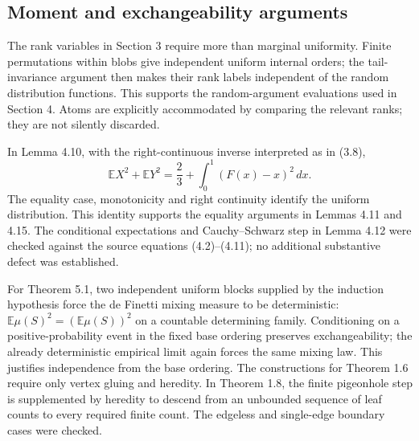 \documentclass[10pt]{article}
\begin{document}
\subsection*{Moment and exchangeability arguments}
The rank variables in Section 3 require more than marginal uniformity. Finite permutations within blobs give independent uniform internal orders; the tail-invariance argument then makes their rank labels independent of the random distribution functions. This supports the random-argument evaluations used in Section 4. Atoms are explicitly accommodated by comparing the relevant ranks; they are not silently discarded.\par
In Lemma 4.10, with the right-continuous inverse interpreted as in (3.8), \[\mathbb E X^2+\mathbb E Y^2
 =\frac23+\int_0^1(F(x)-x)^2\,dx.\] The equality case, monotonicity and right continuity identify the uniform distribution. This identity supports the equality arguments in Lemmas 4.11 and 4.15. The conditional expectations and Cauchy–Schwarz step in Lemma 4.12 were checked against the source equations (4.2)–(4.11); no additional substantive defect was established.\par
For Theorem 5.1, two independent uniform blocks supplied by the induction hypothesis force the de Finetti mixing measure to be deterministic: \(\mathbb E\mu(S)^2=(\mathbb E\mu(S))^2\) on a countable determining family. Conditioning on a positive-probability event in the fixed base ordering preserves exchangeability; the already deterministic empirical limit again forces the same mixing law. This justifies independence from the base ordering. The constructions for Theorem 1.6 require only vertex gluing and heredity. In Theorem 1.8, the finite pigeonhole step is supplemented by heredity to descend from an unbounded sequence of leaf counts to every required finite count. The edgeless and single-edge boundary cases were checked.\par
\end{document}
